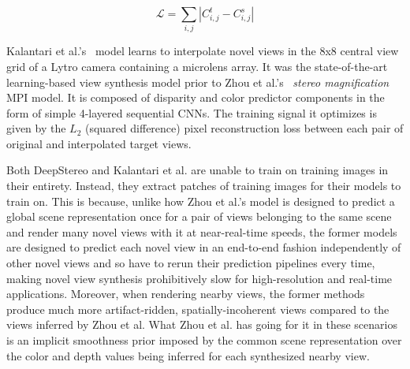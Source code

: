 \[\mathcal{L} = \sum_{i,j} |C_{i,j}^t - C_{i,j}^s|\]

Kalantari et al.'s~\cite{kalantari_2016} model learns to interpolate novel views in the 8x8 central view grid of a Lytro camera containing a microlens array. It was the state-of-the-art learning-based view synthesis model prior to Zhou et al.'s~\cite{zhou2018stereo} \textit{stereo magnification} MPI model. It is composed of disparity and color predictor components in the form of simple 4-layered sequential CNNs. The training signal it optimizes is given by the $L_2$ (squared difference) pixel reconstruction loss between each pair of original and interpolated target views.

Both DeepStereo and Kalantari et al. are unable to train on training images in their entirety. Instead, they extract patches of training images for their models to train on. This is because, unlike how Zhou et al.'s model is designed to predict a global scene representation once for a pair of views belonging to the same scene and render many novel views with it at near-real-time speeds, the former models are designed to predict each novel view in an end-to-end fashion independently of other novel views and so have to rerun their prediction pipelines every time, making novel view synthesis prohibitively slow for high-resolution and real-time applications. Moreover, when rendering nearby views, the former methods produce much more artifact-ridden, spatially-incoherent views compared to the views inferred by Zhou et al. What Zhou et al. has going for it in these scenarios is an implicit smoothness prior imposed by the common scene representation over the color and depth values being inferred for each synthesized nearby view. 

